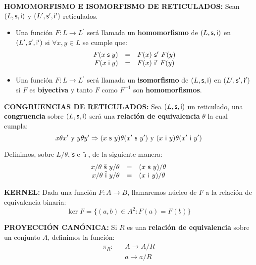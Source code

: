   \vspace{3mm}
  \PN \textbf{HOMOMORFISMO E ISOMORFISMO DE RETICULADOS:} Sean $(L, \mathsf{s}, \mathsf{i})$ y $(L^{\prime}, \mathsf{s}^{\prime},
  \mathsf{i}^{\prime})$ reticulados.
  \begin{itemize}
    \item Una función $F: L \rightarrow L^{\prime}$ será llamada un \textbf{homomorfismo} de $(L, \mathsf{s}, \mathsf{i})$ en
      $(L^{\prime}, \mathsf{s}^{\prime}, \mathsf{i}^{\prime})$ si $\forall x, y \in L$ se cumple que:
      \[
        \begin{array}{rcl}
          F(x \mathsf{\;s\;} y) &=& F(x) \ \mathsf{s}^{\prime} \ F(y) \\
          F(x \mathsf{\;i\;} y) &=& F(x) \ \mathsf{i}^{\prime} \ F(y)
        \end{array}
      \]
    \item Una función $F: L \rightarrow L^{\prime}$ será llamada un \textbf{isomorfismo} de $(L, \mathsf{s}, \mathsf{i})$ en
      $(L^{\prime}, \mathsf{s}^{\prime}, \mathsf{i}^{\prime})$ si $F$ es \textbf{biyectiva} y tanto $F$ como $F^{-1}$ son
      \textbf{homomorfismos}.
  \end{itemize}

  \vspace{3mm}
  \PN \textbf{CONGRUENCIAS DE RETICULADOS:} Sea $(L, \mathsf{s}, \mathsf{i})$ un reticulado, una \textbf{congruencia} sobre
  $(L, \mathsf{s}, \mathsf{i})$ será una \textbf{relación de equivalencia} $\theta$ la cual cumpla:
  \[
    x \theta x^{\prime} \text{ y } y \theta y^{\prime} \Rightarrow (x \ \SU \ y) \theta (x^{\prime} \ \SU \ y^{\prime})
    \text{ y } (x \ \IN \ y) \theta (x^{\prime} \ \IN \ y^{\prime})
  \]

  \PN Definimos, sobre $L/\theta$, $\mathsf{\tilde{s}}$ e $\mathsf{\tilde{\imath}}$, de la siguiente manera:
  \[
    \begin{array}{rcl}
      x/\theta \ \mathsf{\tilde{s}} \ y/\theta &=& (x \ \SU \ y)/\theta \\
      x/\theta \ \mathsf{\tilde{i}} \ y/\theta &=& (x \ \IN \ y)/\theta
    \end{array}
  \]

  \vspace{3mm}
  \PN \textbf{KERNEL:} Dada una función $F: A \rightarrow B$, llamaremos núcleo de $F$ a la relación de equivalencia
  binaria:
  \[
    \ker F = \{(a,b) \in A^{2}: F(a) = F(b)\}
  \]

  \vspace{3mm}
  \PN \textbf{PROYECCIÓN CANÓNICA:} Si $R$ es una \textbf{relación de equivalencia} sobre un conjunto $A$, definimos la
  función:
  \[
    \begin{array}{ccc}
      \pi_{R}: && A \rightarrow A/R \\
      && a \rightarrow a/R
    \end{array}
  \]
